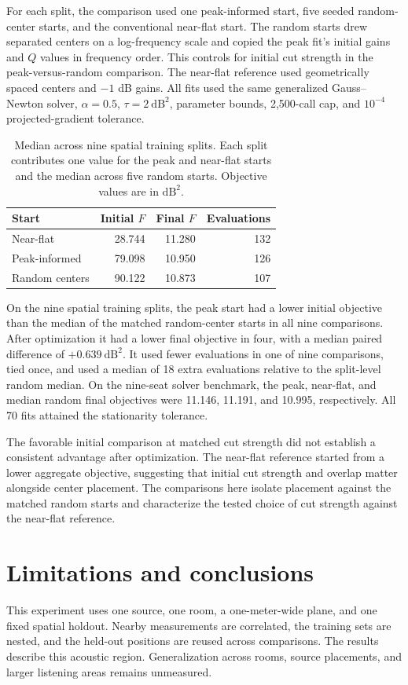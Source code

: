 \documentclass[11pt,letterpaper]{article}
\newcommand{\loss}{\mathrm{dB}^2}
\begin{document}
For each split, the comparison used one peak-informed start, five seeded
random-center starts, and the conventional near-flat start. The random
starts drew separated centers on a log-frequency scale and copied the
peak fit's initial gains and $Q$ values in frequency order. This controls
for initial cut strength in the peak-versus-random comparison. The near-flat
reference used geometrically spaced centers and $-1$ dB gains. All fits
used the same generalized Gauss--Newton solver, $\alpha=0.5$, $\tau=2~\loss$,
parameter bounds, 2,500-call cap, and $10^{-4}$ projected-gradient tolerance.

\begin{table}[h!]
\centering
\small
\begin{tabular}{lrrr}
\toprule
Start & Initial $F$ & Final $F$ & Evaluations \\
\midrule
Near-flat & 28.744 & 11.280 & 132 \\
Peak-informed & 79.098 & 10.950 & 126 \\
Random centers & 90.122 & 10.873 & 107 \\
\bottomrule
\end{tabular}
\caption{Median across nine spatial training splits. Each split contributes
one value for the peak and near-flat starts and the median across five random
starts. Objective values are in $\loss$.}
\end{table}

On the nine spatial training splits, the peak start had a lower initial
objective than the median of the matched random-center starts in all nine
comparisons. After optimization it had a lower final objective in four,
with a median paired difference of $+0.639~\loss$. It used fewer evaluations
in one of nine comparisons, tied once, and used a median of 18 extra
evaluations relative to the split-level random median. On the nine-seat
solver benchmark, the peak, near-flat, and median random final objectives
were 11.146, 11.191, and 10.995, respectively. All 70 fits attained the
stationarity tolerance.

The favorable initial comparison at matched cut strength did not establish
a consistent advantage after optimization. The near-flat reference started
from a lower aggregate objective, suggesting that initial cut strength and
overlap matter alongside center placement. The comparisons here isolate
placement against the matched random starts and characterize the tested
choice of cut strength against the near-flat reference.

\clearpage
\section{Limitations and conclusions}
This experiment uses one source, one room, a one-meter-wide plane, and one
fixed spatial holdout. Nearby measurements are correlated, the training
sets are nested, and the held-out positions are reused across comparisons.
The results describe this acoustic region. Generalization across rooms,
source placements, and larger listening areas remains unmeasured.
\end{document}
